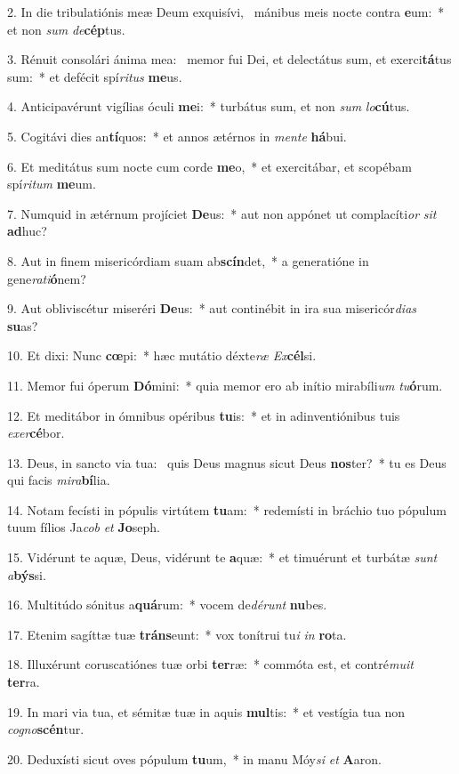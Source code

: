 2. In die tribulatiónis meæ Deum exquisívi, \dag\  mánibus meis nocte contra \textbf{e}um:~*  et non \textit{sum} \textit{de}\textbf{cép}tus.\

3. Rénuit consolári ánima mea: \dag\  memor fui Dei, et delectátus sum, et exerci\textbf{tá}tus sum:~*  et defécit spí\textit{ri}\textit{tus} \textbf{me}us.\

4. Anticipavérunt vigílias óculi \textbf{me}i:~*  turbátus sum, et non \textit{sum} \textit{lo}\textbf{cú}tus.\

5. Cogitávi dies an\textbf{tí}quos:~*  et annos ætérnos in \textit{men}\textit{te} \textbf{há}bui.\

6. Et meditátus sum nocte cum corde \textbf{me}o,~*  et exercitábar, et scopébam spí\textit{ri}\textit{tum} \textbf{me}um.\

7. Numquid in ætérnum projíciet \textbf{De}us:~*  aut non appónet ut complacíti\textit{or} \textit{sit} \textbf{ad}huc?\

8. Aut in finem misericórdiam suam ab\textbf{scín}det,~*  a generatióne in gene\textit{ra}\textit{ti}\textbf{ó}nem?\

9. Aut obliviscétur miseréri \textbf{De}us:~*  aut continébit in ira sua misericór\textit{di}\textit{as} \textbf{su}as?\

10. Et dixi: Nunc \textbf{cœ}pi:~*  hæc mutátio déxte\textit{ræ} \textit{Ex}\textbf{cél}si.\

11. Memor fui óperum \textbf{Dó}mini:~*  quia memor ero ab inítio mirabíli\textit{um} \textit{tu}\textbf{ó}rum.\

12. Et meditábor in ómnibus opéribus \textbf{tu}is:~*  et in adinventiónibus tuis \textit{ex}\textit{er}\textbf{cé}bor.\

13. Deus, in sancto via tua: \dag\  quis Deus magnus sicut Deus \textbf{nos}ter?~*  tu es Deus qui facis \textit{mi}\textit{ra}\textbf{bí}lia.\

14. Notam fecísti in pópulis virtútem \textbf{tu}am:~*  redemísti in bráchio tuo pópulum tuum fílios Ja\textit{cob} \textit{et} \textbf{Jo}seph.\

15. Vidérunt te aquæ, Deus, vidérunt te \textbf{a}quæ:~*  et timuérunt et turbátæ \textit{sunt} \textit{a}\textbf{býs}si.\

16. Multitúdo sónitus a\textbf{quá}rum:~*  vocem de\textit{dé}\textit{runt} \textbf{nu}bes.\

17. Etenim sagíttæ tuæ \textbf{tráns}eunt:~*  vox tonítrui tu\textit{i} \textit{in} \textbf{ro}ta.\

18. Illuxérunt coruscatiónes tuæ orbi \textbf{ter}ræ:~*  commóta est, et contré\textit{mu}\textit{it} \textbf{ter}ra.\

19. In mari via tua, et sémitæ tuæ in aquis \textbf{mul}tis:~*  et vestígia tua non \textit{co}\textit{gno}\textbf{scén}tur.\

20. Deduxísti sicut oves pópulum \textbf{tu}um,~*  in manu Móy\textit{si} \textit{et} \textbf{A}aron.\

